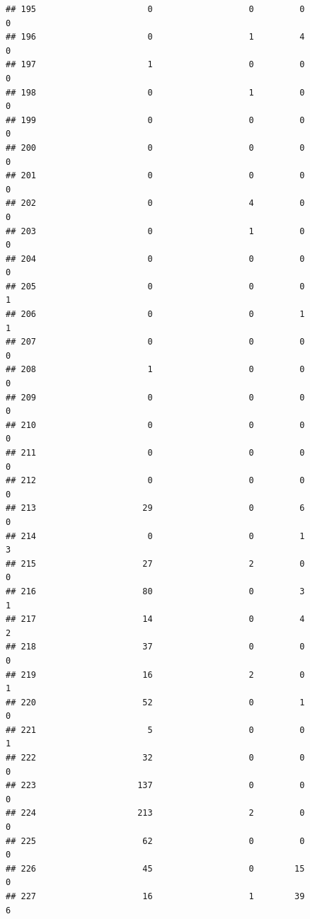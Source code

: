 \documentclass[
]{article}
\begin{document}
\begin{verbatim}
## 195                      0                   0         0                  0
## 196                      0                   1         4                  0
## 197                      1                   0         0                  0
## 198                      0                   1         0                  0
## 199                      0                   0         0                  0
## 200                      0                   0         0                  0
## 201                      0                   0         0                  0
## 202                      0                   4         0                  0
## 203                      0                   1         0                  0
## 204                      0                   0         0                  0
## 205                      0                   0         0                  1
## 206                      0                   0         1                  1
## 207                      0                   0         0                  0
## 208                      1                   0         0                  0
## 209                      0                   0         0                  0
## 210                      0                   0         0                  0
## 211                      0                   0         0                  0
## 212                      0                   0         0                  0
## 213                     29                   0         6                  0
## 214                      0                   0         1                  3
## 215                     27                   2         0                  0
## 216                     80                   0         3                  1
## 217                     14                   0         4                  2
## 218                     37                   0         0                  0
## 219                     16                   2         0                  1
## 220                     52                   0         1                  0
## 221                      5                   0         0                  1
## 222                     32                   0         0                  0
## 223                    137                   0         0                  0
## 224                    213                   2         0                  0
## 225                     62                   0         0                  0
## 226                     45                   0        15                  0
## 227                     16                   1        39                  6

\end{verbatim}
\end{document}
